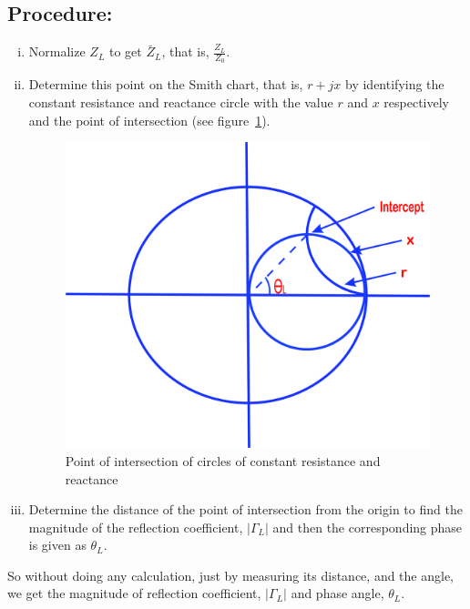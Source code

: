 \subsection*{Procedure:}
\begin{enumerate}[(i)]
\item Normalize $Z_{L}$ to get $\bar{Z}_{L}$, that is, $\frac{Z_{L}}{Z_{0}}$.
\item Determine this point on the Smith chart, that is, $r+jx$ by identifying the constant resistance and reactance circle with the value $r$ and $x$ respectively and the point of intersection (see figure~\ref{fig:lfds}).
\begin{figure}[h]
\centering
\includegraphics[width=0.7\linewidth]{graphics/lfds}
\caption{Point of intersection of circles of constant resistance and reactance}
\label{fig:lfds}
\end{figure}

\item Determine the distance of the point of intersection from the origin to find the magnitude of the reflection coefficient, $|\Gamma_L|$ and then the corresponding phase is given as $\theta_L$.
\end{enumerate}

So without doing any calculation, just by measuring its distance, and the angle, we get the magnitude of reflection coefficient, $|\Gamma_L|$
and phase angle, $\theta_L$. 

